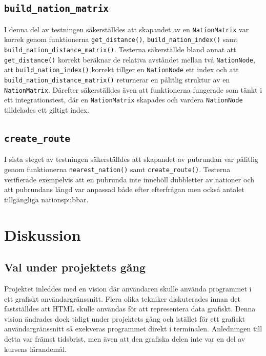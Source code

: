 \documentclass[a4paper, 12pt]{article}
\begin{document}
    \subsection{\texttt{build\_nation\_matrix}}
    \label{subsec: build_nation_matrix}
        I denna del av testningen säkerställdes att skapandet av en \texttt{NationMatrix} var korrek genom funktionerna \texttt{get\_distance()}, \texttt{build\_nation\_index()} samt \texttt{build\_nation\_distance\_matrix()}. Testerna säkerställde bland annat att \texttt{get\_distance()} korrekt beräknar de relativa avståndet mellan två \texttt{NationNode}, att \texttt{build\_nation\_index()} korrekt tillger en \texttt{NationNode} ett index och att \texttt{build\_nation\_distance\_matrix()} returnerar en pålitlig struktur av en \texttt{NationMatrix}. Därefter säkerställdes även att funktionerna fungerade som tänkt i ett integrationstest, där en \texttt{NationMatrix} skapades och vardera \texttt{NationNode} tilldelades ett giltigt index.

    \subsection{\texttt{create\_route}}
    \label{subsec: create_route}
        I sista steget av testningen säkerställdes att skapandet av pubrundan var pålitlig genom funktionerna \texttt{nearest\_nation()} samt \texttt{create\_route()}. Testerna verifierade exempelvis att en pubrunda inte innehöll dubbletter av nationer och att pubrundans längd var anpassad både efter efterfrågan men också antalet tillgängliga nationspubbar.

\section{Diskussion}
\label{sec: diskussion}
    \subsection{Val under projektets gång}
    \label{subsec: val}
        Projektet inleddes med en vision där användaren skulle använda programmet i ett grafiskt användargränssnitt. Flera olika tekniker diskuterades innan det fastställdes att HTML skulle användas för att representera data grafiskt. Denna vision ändrades dock tidigt under projektets gång och istället för ett grafiskt användargränssnitt så exekveras programmet direkt i terminalen. Anledningen till detta var främst tidsbrist, men även att den grafiska delen inte var en del av kursens lärandemål.
\end{document}

